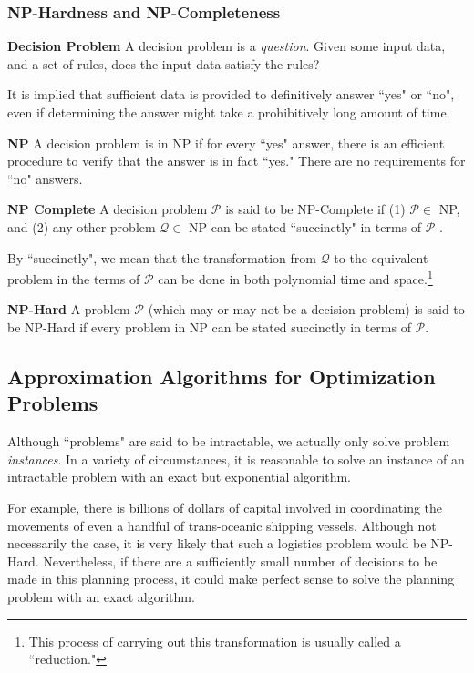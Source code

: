\documentclass[12pt]{article}
\begin{document}
\subsubsection*{NP-Hardness and NP-Completeness}
\begin{definition}
\textbf{Decision Problem  } A decision problem is a \textit{question}.
 Given some input data, and a set of rules, does the input data satisfy the rules?
\end{definition}
It is implied that sufficient data is provided to definitively answer ``yes" or ``no", even if determining the answer might take a prohibitively long amount of time.
\begin{definition}
\textbf{NP  } A decision problem is in NP if for every ``yes" answer, there is an efficient procedure to verify that the answer is in fact ``yes." 
There are no requirements for ``no" answers.
\end{definition}
\begin{definition}
\textbf{NP Complete  } A decision problem $\mathcal{P}$ is said to be NP-Complete if (1)
$\mathcal{P} \in $ NP, and (2) any other problem $\mathcal{Q} \in$ NP can be stated ``succinctly" in terms of $\mathcal{P}$ .
\end{definition}
By ``succinctly", we mean that the transformation from $\mathcal{Q}$ to the equivalent problem in the terms of $\mathcal{P}$ can be done in both polynomial time and space.\footnote{This process of carrying out this transformation is usually called a ``reduction."}
\begin{definition}
\textbf{NP-Hard  } A problem $\mathcal{P}$ (which may or may not be a decision problem) is said to be NP-Hard if every problem in NP can be stated succinctly in terms of $\mathcal{P}$.
\end{definition}

\subsection*{Approximation Algorithms for Optimization Problems}\label{subsec:intractProbCope}

Although ``problems" are said to be intractable, we actually only solve problem \textit{instances}. 
In a variety of circumstances, it is reasonable to solve an instance of an intractable problem with an exact but exponential algorithm.

For example, there is billions of dollars of capital involved in coordinating the movements of even a handful of trans-oceanic shipping vessels. 
Although not necessarily the case, it is very likely that such a logistics problem would be NP-Hard.
Nevertheless, if there are a sufficiently small number of decisions to be made in this planning process, it could make perfect sense to solve the planning problem with an exact algorithm.
\end{document}
